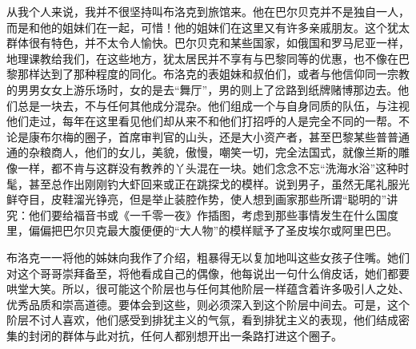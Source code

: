 \par 从我个人来说，我并不很坚持叫布洛克到旅馆来。他在巴尔贝克并不是独自一人，而是和他的姐妹们在一起，可惜！他的姐妹们在这里又有许多亲戚朋友。这个犹太群体很有特色，并不太令人愉快。巴尔贝克和某些国家，如俄国和罗马尼亚一样，地理课教给我们，在这些地方，犹太居民并不享有与巴黎同等的优惠，也不像在巴黎那样达到了那种程度的同化。布洛克的表姐妹和叔伯们，或者与他信仰同一宗教的男男女女上游乐场时，女的是去“舞厅”，男的则上了岔路到纸牌赌博那边去。他们总是一块去，不与任何其他成分混杂。他们组成一个与自身同质的队伍，与注视他们走过，每年在这里看见他们却从来不和他们打招呼的人是完全不同的一帮。不论是康布尔梅的圈子，首席审判官的山头，还是大小资产者，甚至巴黎某些普普通通的杂粮商人，他们的女儿，美貌，傲慢，嘲笑一切，完全法国式，就像兰斯的雕像一样，都不肯与这群没有教养的丫头混在一块。她们念念不忘“洗海水浴”这种时髦，甚至总作出刚刚钓大虾回来或正在跳探戈的模样。说到男子，虽然无尾礼服光鲜夺目，皮鞋溜光铮亮，但是举止装腔作势，使人想到画家那些所谓“聪明的”讲究：他们要给福音书或《一千零一夜》作插图，考虑到那些事情发生在什么国度里，偏偏把巴尔贝克最大腹便便的“大人物”的模样赋予了圣皮埃尔或阿里巴巴。
\par 布洛克一一将他的姊妹向我作了介绍，粗暴得无以复加地叫这些女孩子住嘴。她们对这个哥哥崇拜备至，将他看成自己的偶像，他每说出一句什么俏皮话，她们都要哄堂大笑。所以，很可能这个阶层也与任何其他阶层一样蕴含着许多吸引人之处、优秀品质和崇高道德。要体会到这些，则必须深入到这个阶层中间去。可是，这个阶层不讨人喜欢，他们感受到排犹主义的气氛，看到排犹主义的表现，他们结成密集的封闭的群体与此对抗，任何人都别想开出一条路打进这个圈子。
